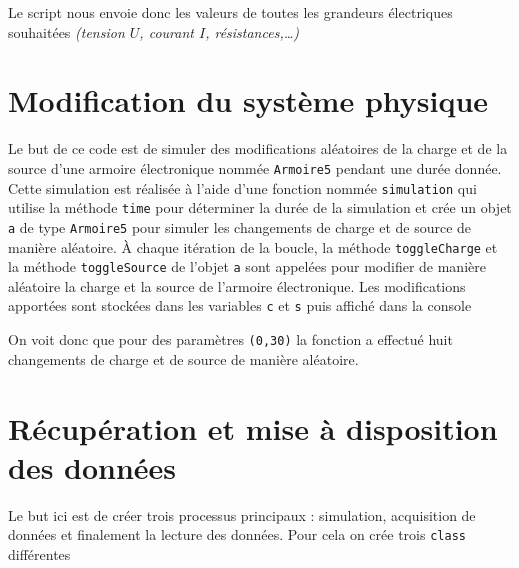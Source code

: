 \documentclass[oneside]{report}
\begin{document}




Le script nous envoie donc les valeurs de toutes les grandeurs électriques souhaitées \emph{(tension \(U\), courant \(I\), résistances,\ldots)}


\section{Modification du système physique}


Le but de ce code est de simuler des modifications aléatoires de la charge et de la source d'une armoire électronique nommée \texttt{Armoire5} pendant une durée donnée. Cette simulation est réalisée à l'aide d'une fonction nommée \texttt{simulation} qui utilise la méthode \texttt{time} pour déterminer la durée de la simulation et crée un objet \texttt{a} de type \texttt{Armoire5} pour simuler les changements de charge et de source de manière aléatoire. À chaque itération de la boucle, la méthode \texttt{toggleCharge} et la méthode \texttt{toggleSource} de l'objet \texttt{a} sont appelées pour modifier de manière aléatoire la charge et la source de l'armoire électronique. Les modifications apportées sont stockées dans les variables \texttt{c} et \texttt{s} puis affiché dans la console





On voit donc que pour des paramètres \texttt{(0,30)} la fonction a effectué huit changements de charge et de source de manière aléatoire. 


\section{Récupération et mise à disposition des données}


Le but ici est de créer trois processus principaux : simulation, acquisition de données et finalement la lecture des données. Pour cela on crée trois \texttt{class} différentes
\end{document}
